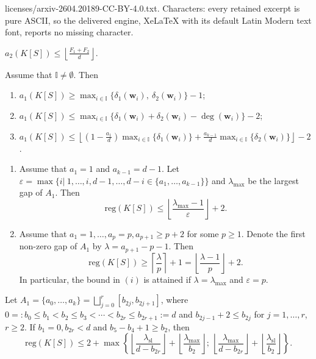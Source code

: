 \documentclass[10pt,a4paper]{amsart}
\def\Iset{{\mathbb I}}
\def\deg{\operatorname{deg}}
\def\reg{\mathrm{reg}}
\def\wbf{{\mathbf w}}
\begin{document}
licenses/arxiv-2604.20189-CC-BY-4.0.txt. Characters: every retained excerpt is pure ASCII, so the delivered engine, XeLaTeX with its default Latin Modern text font, reports no missing character.
\begin{Lemma} \label{B2}  $a_2(K[S]) \le \left\lfloor \frac{F_1 + F_2}{d} \right\rfloor$.
\end{Lemma}

\begin{Theorem} \label{A4} Assume that $\Iset \neq \emptyset$. Then
\begin{enumerate}[\((i)\)]
    \item $a_1(K[S])  \geq \max_{i\in \Iset}
\{\delta_1(\wbf_i),\ \delta_2(\wbf_i)\} - 1$;
\item $a_1(K[S])  \leq \max_{i\in \Iset}
 \{\delta_1(\wbf_i) +  \delta_2(\wbf_i) - \deg(\wbf_i) \} - 2 $;
 \item $a_1(K[S])  \leq  \left\lfloor \left( 1- \frac{a_1}{d} \right)  \max_{i\in \Iset} \{\delta_1(\wbf_i) \} +  \frac{a_{k-1}}{d}  \max_{i\in \Iset}
\{  \delta_2(\wbf_i) \} \right\rfloor - 2$.
\end{enumerate}
\end{Theorem}

\begin{Corollary} \label{A5} 
\begin{enumerate}[\((i)\)]
    \item Assume that $a_1=1$ and $a_{k-1} = d-1$. Let $\varepsilon = \max\{i|\ 1,\ldots,i, d-1,\ldots,d-i \in \{a_1,\ldots,a_{k-1} \}\}$ and $\lambda_{\max}$ be the largest gap of $A_1$. Then
$$\reg(K[S]) \leq \left\lfloor \frac{\lambda_{\max} -1}{\varepsilon} \right\rfloor + 2.$$
\item Assume that $a_1=1,\ldots,a_p = p, a_{p+1} \ge p+2$ for some $p\ge 1$. Denote the first non-zero gap of $A_1$ by $\lambda = a_{p+1}-p-1$. Then
$$\reg(K[S]) \geq \left\lceil \frac{\lambda}{p} \right\rceil + 1 = \left\lfloor \frac{\lambda -1}{p} \right\rfloor + 2.$$
In particular,  the bound in \((i)\) is attained if $\lambda = \lambda_{\max}$ and $ \varepsilon = p$.
\end{enumerate}
\end{Corollary}

\begin{Proposition} \label{Bd2} Let $A_1 = \{a_0,\ldots,a_k\} = \bigsqcup_{j=0}^r [b_{2j},b_{2j+1}]$, where $0=:b_0 \leq b_1 < b_2 \leq b_3 < \cdots < b_{2r}\leq b_{2r+1} := d$ and $b_{2j-1} + 2 \leq b_{2j}$ for $j=1,\ldots,r$, $r\ge 2$.  If $b_1 = 0, b_{2r} < d$ and $b_5 - b_4 + 1\geq b_2$, then
$$\reg(K[S]) \leq 2+ \max\left\{ \left\lfloor \frac{ \lambda_{\mathrm{sl}}}{d-b_{2r}} \right\rfloor + \left\lfloor \frac{\lambda_{\max}}{b_2} \right\rfloor;\ \left\lfloor \frac{ \lambda_{\max}}{d-b_{2r}} \right\rfloor + \left\lfloor \frac{\lambda_{\mathrm{sl}}}{b_2} \right\rfloor \right\}.$$
\end{Proposition} 
\end{document}
